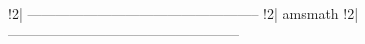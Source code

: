 !2| --------------------------------------------------
!2| {amsmath}
!2| --------------------------------------------------

\usepackage{amsmath}

